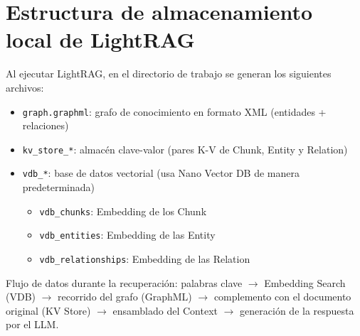 \section{Estructura de almacenamiento local de LightRAG}

Al ejecutar LightRAG, en el directorio de trabajo se generan los siguientes archivos:

\begin{itemize}
    \item \texttt{graph.graphml}: grafo de conocimiento en formato XML (entidades + relaciones)
    \item \texttt{kv\_store\_*}: almacén clave-valor (pares K-V de Chunk, Entity y Relation)
    \item \texttt{vdb\_*}: base de datos vectorial (usa Nano Vector DB de manera predeterminada)
    \begin{itemize}
        \item \texttt{vdb\_chunks}: Embedding de los Chunk
        \item \texttt{vdb\_entities}: Embedding de las Entity
        \item \texttt{vdb\_relationships}: Embedding de las Relation
    \end{itemize}
\end{itemize}

Flujo de datos durante la recuperación: palabras clave $\rightarrow$ Embedding Search (VDB) $\rightarrow$ recorrido del grafo (GraphML) $\rightarrow$ complemento con el documento original (KV Store) $\rightarrow$ ensamblado del Context $\rightarrow$ generación de la respuesta por el LLM.


